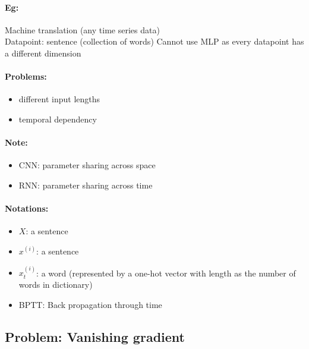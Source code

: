 \documentclass[11pt]{article}
\begin{document}
\paragraph{Eg:} Machine translation (any time series data) \\
Datapoint: sentence (collection of words)
Cannot use MLP as every datapoint has a different dimension \\

\paragraph{Problems:}
\begin{itemize}
\item different input lengths
\item temporal dependency
\end{itemize}

\paragraph{Note:}
\begin{itemize}
\item CNN: parameter sharing across space
\item RNN: parameter sharing across time
\end{itemize}


\paragraph{Notations:}
\begin{itemize}
\item $X$: a sentence
\item $x^{(i)}$: a sentence
\item $x_t^{(i)}$: a word (represented by a one-hot vector with length as the number of words in dictionary)
\item BPTT: Back propagation through time
\end{itemize}

\subsection{Problem: Vanishing gradient}
\label{sec:probl-vanish-grad}
\end{document}
